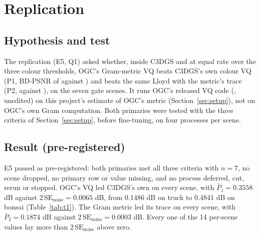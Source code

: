 \section{Replication}
\label{sec:replication}

\subsection{Hypothesis and test}

The replication (E5, Q1) asked whether, inside C3DGS and at equal rate over the three colour thresholds, OGC's Gram-metric VQ beats C3DGS's own colour VQ (P1, BD-PSNR of  against ) and beats the same Lloyd with the metric's trace (P2,  against ), on the seven gate scenes. %
It runs OGC's released VQ code (, unedited) on this project's estimate of OGC's metric (Section~\ref{sec:setup}), not on OGC's own Gram computation. %
Both primaries were tested with the three criteria of Section~\ref{sec:setup}, before fine-tuning, on four processes per scene. %

\subsection{Result (pre-registered)}

E5 passed as pre-registered: both primaries met all three criteria with $n = 7$, no scene dropped, no primary row or value missing, and no process deferred, cut, rerun or stopped. %
OGC's VQ led C3DGS's own on every scene, with $\bar P_1 = 0.3558$ dB against $2\,\mathrm{SE}_{\mathrm{noise}} = 0.0065$ dB, from 0.1486 dB on truck to 0.4841 dB on bonsai (Table~\ref{tab:t1}). %
The Gram metric led its trace on every scene, with $\bar P_2 = 0.1874$ dB against $2\,\mathrm{SE}_{\mathrm{noise}} = 0.0003$ dB. %
Every one of the 14 per-scene values lay more than $2\,\mathrm{SE}_{\mathrm{noise}}$ above zero. %

\begin{table}[t]
\centering
\small
\caption{E5's primaries per scene (dB), as the verdict compared them (9 decimals). $D_s$ is the mean of the two $j = 0$ processes' paired difference. Pre-registered; generated from the committed bundles.}
\label{tab:t1}

\end{table}

